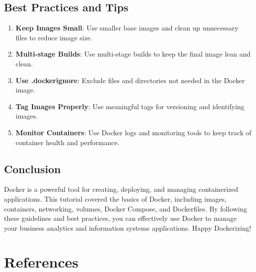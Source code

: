 \documentclass[
  letterpaper,
  DIV=11,
  numbers=noendperiod]{scrreprt}
\providecommand{\tightlist}{%
  \setlength{\itemsep}{0pt}\setlength{\parskip}{0pt}}\usepackage{longtable,booktabs,array}
\newlength{\cslhangindent}
\newenvironment{CSLReferences}[2] %
 {\begin{list}{}{%
  \setlength{\itemindent}{0pt}
  \setlength{\leftmargin}{0pt}
  \setlength{\parsep}{0pt}
  \ifodd #1
   \setlength{\leftmargin}{\cslhangindent}
   \setlength{\itemindent}{-1\cslhangindent}
  \fi
  \setlength{\itemsep}{#2\baselineskip}}}
 {\end{list}}
\begin{document}
\section{Best Practices and Tips}\label{best-practices-and-tips}

\begin{enumerate}
\def\labelenumi{\arabic{enumi}.}
\tightlist
\item
  \textbf{Keep Images Small}: Use smaller base images and clean up
  unnecessary files to reduce image size.
\item
  \textbf{Multi-stage Builds}: Use multi-stage builds to keep the final
  image lean and clean.
\item
  \textbf{Use .dockerignore}: Exclude files and directories not needed
  in the Docker image.
\item
  \textbf{Tag Images Properly}: Use meaningful tags for versioning and
  identifying images.
\item
  \textbf{Monitor Containers}: Use Docker logs and monitoring tools to
  keep track of container health and performance.
\end{enumerate}

\section{Conclusion}\label{conclusion-50}

Docker is a powerful tool for creating, deploying, and managing
containerized applications. This tutorial covered the basics of Docker,
including images, containers, networking, volumes, Docker Compose, and
Dockerfiles. By following these guidelines and best practices, you can
effectively use Docker to manage your business analytics and information
systems applications. Happy Dockerizing!


\chapter*{References}\label{references}


\label{refs}
\begin{CSLReferences}{0}{1}
\end{CSLReferences}
\end{document}
